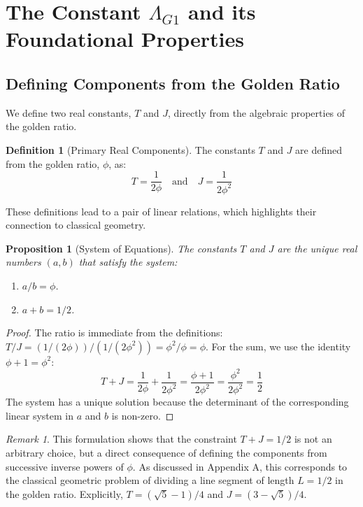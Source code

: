 \documentclass{amsart}
\theoremstyle{plain}
\newtheorem{proposition}[theorem]{Proposition}
\theoremstyle{definition}
\newtheorem{definition}[theorem]{Definition}
\theoremstyle{remark}
\newtheorem*{remark}{Remark}
\begin{document}
\section{The Constant \texorpdfstring{$\Lambda_{G1}$}{Lambda\_G1} and its Foundational Properties}

\subsection{Defining Components from the Golden Ratio}
We define two real constants, $T$ and $J$, directly from the algebraic properties of the golden ratio.

\begin{definition}[Primary Real Components]
The constants $T$ and $J$ are defined from the golden ratio, $\phi$, as:
$$ T = \frac{1}{2\phi} \quad \text{and} \quad J = \frac{1}{2\phi^2} $$
\end{definition}

These definitions lead to a pair of linear relations, which highlights their connection to classical geometry.

\begin{proposition}[System of Equations]
The constants $T$ and $J$ are the unique real numbers $(a,b)$ that satisfy the system:
\begin{enumerate}
    \item $a/b = \phi$.
    \item $a+b = 1/2$.
\end{enumerate}
\end{proposition}
\begin{proof}
The ratio is immediate from the definitions: $T/J = (1/(2\phi))/(1/(2\phi^2)) = \phi^2/\phi = \phi$. For the sum, we use the identity $\phi+1 = \phi^2$:
$$ T+J = \frac{1}{2\phi} + \frac{1}{2\phi^2} = \frac{\phi+1}{2\phi^2} = \frac{\phi^2}{2\phi^2} = \frac{1}{2} $$
The system has a unique solution because the determinant of the corresponding linear system in $a$ and $b$ is non-zero.
\end{proof}

\begin{remark}
This formulation shows that the constraint $T+J=1/2$ is not an arbitrary choice, but a direct consequence of defining the components from successive inverse powers of $\phi$. As discussed in Appendix A, this corresponds to the classical geometric problem of dividing a line segment of length $L=1/2$ in the golden ratio. Explicitly, $T = (\sqrt{5}-1)/4$ and $J = (3-\sqrt{5})/4$.
\end{remark}
\end{document}
